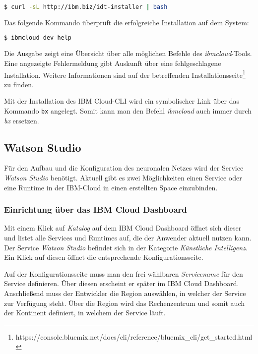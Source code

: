 \begin{lstlisting}[language=bash, caption=Installation des IBM Cloud CLI, label=ls:vorbereitung_ibmcli]
    $ curl -sL http://ibm.biz/idt-installer | bash
\end{lstlisting}

Das folgende Kommando überprüft die erfolgreiche Installation auf dem System:

\begin{lstlisting}[language=bash, caption=Installation des CLI überprüfen, label=ls:vorbereitung_ibmclitest]
    $ ibmcloud dev help
\end{lstlisting}

Die Ausgabe zeigt eine Übersicht über alle möglichen Befehle des \textit{ibmcloud}-Tools. Eine angezeigte Fehlermeldung
gibt Auskunft über eine fehlgeschlagene Installation. Weitere Informationen sind auf der betreffenden
Installationsseite\footnote{https://console.bluemix.net/docs/cli/reference/bluemix\_cli/get\_started.html} zu finden.

Mit der Installation des IBM Cloud-CLI wird ein symbolischer Link über das Kommando \texttt{bx} angelegt. Somit kann man
den Befehl \textit{ibmcloud} auch immer durch \textit{bx} ersetzen.


\subsection{Watson Studio}
Für den Aufbau und die Konfiguration des neuronalen Netzes wird der Service \textit{Watson Studio} benötigt. Aktuell gibt
es zwei Möglichkeiten einen Service oder eine Runtime in der IBM-Cloud in einen erstellten Space einzubinden.

\subsubsection{Einrichtung über das IBM Cloud Dashboard}
Mit einem Klick auf \textit{Katalog} auf dem IBM Cloud Dashboard öffnet sich dieser und listet alle Services und Runtimes
auf, die der Anwender aktuell nutzen kann. Der Service \textit{Watson Studio} befindet sich in der Kategorie
\textit{Künstliche Intelligenz}. Ein Klick auf diesen öffnet die entsprechende Konfigurationsseite.

Auf der Konfigurationsseite muss man den frei wählbaren \textit{Servicename} für den Service definieren. Über diesen
erscheint er später im IBM Cloud Dashboard. Anschließend muss der Entwickler die Region auswählen, in welcher der Service
zur Verfügung steht. Über die Region wird das Rechenzentrum und somit auch der Kontinent definiert, in welchem der Service
läuft.

